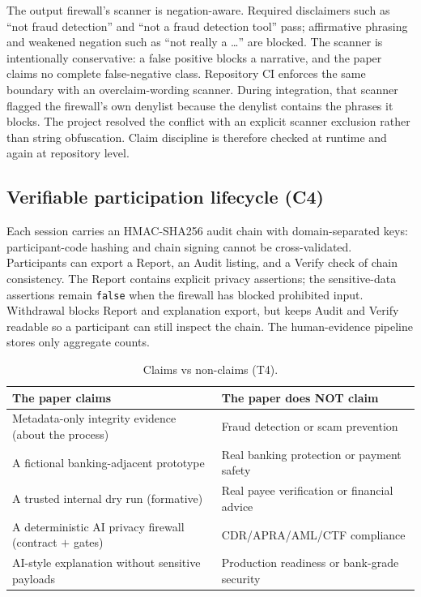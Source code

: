 \documentclass[conference]{IEEEtran}
\begin{document}
The output firewall's scanner is negation-aware. Required disclaimers such as
``not fraud detection'' and ``not a fraud detection tool'' pass; affirmative
phrasing and weakened negation such as ``not really a \ldots'' are blocked. The
scanner is intentionally conservative: a false positive blocks a narrative, and
the paper claims no complete false-negative class. Repository CI enforces the
same boundary with an overclaim-wording scanner. During integration, that scanner
flagged the firewall's own denylist because the denylist contains the phrases it
blocks. The project resolved the conflict with an explicit scanner exclusion
rather than string obfuscation. Claim discipline is therefore checked at runtime
and again at repository level.

\subsection{Verifiable participation lifecycle (C4)}
\label{sec:c4}

Each session carries an HMAC-SHA256 audit chain with domain-separated keys:
participant-code hashing and chain signing cannot be cross-validated.
Participants can export a Report, an Audit listing, and a Verify check of chain
consistency. The Report contains explicit privacy assertions; the sensitive-data
assertions remain \texttt{false} when the firewall has blocked prohibited input.
Withdrawal blocks Report and explanation export, but keeps Audit and Verify
readable so a participant can still inspect the chain. The human-evidence pipeline
stores only aggregate counts.

\begin{table}[t]
\caption{Claims vs non-claims (T4).}
\centering
\footnotesize
\begin{tabular}{p{3.7cm}p{3.7cm}}
\toprule
The paper claims & The paper does NOT claim \\
\midrule
Metadata-only integrity evidence (about the process) & Fraud detection or scam
prevention \\
A fictional banking-adjacent prototype & Real banking protection or payment
safety \\
A trusted internal dry run (formative) & Real payee verification or financial
advice \\
A deterministic AI privacy firewall (contract $+$ gates) & CDR/APRA/AML/CTF
compliance \\
AI-style explanation without sensitive payloads & Production readiness or
bank-grade security \\
\bottomrule
\end{tabular}
\label{tab:claims}
\end{table}
\end{document}
